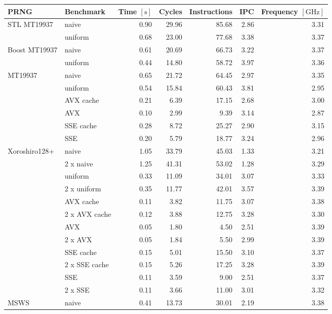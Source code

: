 \documentclass{stdlocal}
\begin{document}
\begin{tabular}{llrrrrr}
  \hline
  \textbf{PRNG} & \textbf{Benchmark} & \textbf{Time} $[\mathrm{s}]$ & \textbf{Cycles} & \textbf{Instructions} & \textbf{IPC} & \textbf{Frequency} $[\mathrm{GHz}]$ \\
  \hline
  \hline
  \multirow{2}{*}{STL MT19937}
  & naive &  0.90 &  29.96  & 85.68 &  2.86 & 3.31 \\
  & uniform & 0.68 & 23.00 & 77.68 & 3.38 & 3.37 \\
  \hline
  \multirow{2}{*}{Boost MT19937}
  & naive & 0.61 & 20.69 & 66.73 & 3.22 & 3.37 \\
  & uniform & 0.44 & 14.80 & 58.72 & 3.97 & 3.36 \\
  \hline
  \multirow{6}{*}{MT19937}
  & naive & 0.65 & 21.72 & 64.45 & 2.97 & 3.35 \\
  & uniform & 0.54 & 15.84 & 60.43 & 3.81 & 2.95 \\
  & AVX cache & 0.21 & 6.39 & 17.15 & 2.68 & 3.00 \\
  & AVX & 0.10 & 2.99 & 9.39 & 3.14 & 2.87 \\
  & SSE cache & 0.28 & 8.72 & 25.27 & 2.90 & 3.15 \\
  & SSE & 0.20 & 5.79 & 18.77 & 3.24 & 2.96 \\
  \hline
  \multirow{12}{*}{Xoroshiro128+}
  & naive & 1.05 & 33.79 & 45.03 & 1.33 & 3.21 \\
  & 2 x naive & 1.25 & 41.31 & 53.02 & 1.28 & 3.29 \\
  & uniform & 0.33 & 11.09 & 34.01 & 3.07 & 3.33 \\
  & 2 x uniform & 0.35 & 11.77 & 42.01 & 3.57 & 3.39 \\
  & AVX cache & 0.11 &  3.82 & 11.75 & 3.07 & 3.38 \\
  & 2 x AVX cache & 0.12 &  3.88 & 12.75 & 3.28 & 3.30 \\
  & AVX & 0.05 &  1.80 &  4.50 & 2.51 & 3.39 \\
  & 2 x AVX & 0.05 &  1.84 &  5.50 & 2.99 & 3.39 \\
  & SSE cache & 0.15 &  5.01 & 15.50 & 3.10 & 3.37 \\
  & 2 x SSE cache & 0.15 &  5.26 & 17.25 & 3.28 & 3.39 \\
  & SSE & 0.11 &  3.59 &  9.00 & 2.51 & 3.37 \\
  & 2 x SSE & 0.11 &  3.66 & 11.00 & 3.01 & 3.32 \\
  \hline
  \multirow{12}{*}{MSWS}
  & naive & 0.41 & 13.73 &    30.01 & 2.19 & 3.38 \\

\end{tabular}
\end{document}
